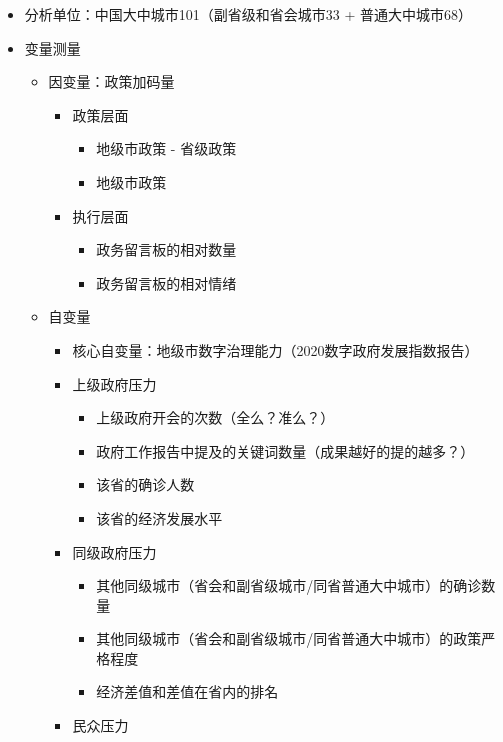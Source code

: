 \documentclass[
  12pt,
]{ctexart}
\providecommand{\tightlist}{%
  \setlength{\itemsep}{0pt}\setlength{\parskip}{0pt}}
\begin{document}
\begin{itemize}
\item
  分析单位：中国大中城市101（副省级和省会城市33 + 普通大中城市68）
\item
  变量测量

  \begin{itemize}
  \tightlist
  \item
    因变量：政策加码量

    \begin{itemize}
    \tightlist
    \item
      政策层面

      \begin{itemize}
      \tightlist
      \item
        地级市政策 - 省级政策
      \item
        地级市政策
      \end{itemize}
    \item
      执行层面

      \begin{itemize}
      \tightlist
      \item
        政务留言板的相对数量
      \item
        政务留言板的相对情绪
      \end{itemize}
    \end{itemize}
  \item
    自变量

    \begin{itemize}
    \tightlist
    \item
      核心自变量：地级市数字治理能力（2020数字政府发展指数报告）
    \item
      上级政府压力

      \begin{itemize}
      \tightlist
      \item
        上级政府开会的次数（全么？准么？）
      \item
        政府工作报告中提及的关键词数量（成果越好的提的越多？）
      \item
        该省的确诊人数
      \item
        该省的经济发展水平
      \end{itemize}
    \item
      同级政府压力

      \begin{itemize}
      \tightlist
      \item
        其他同级城市（省会和副省级城市/同省普通大中城市）的确诊数量
      \item
        其他同级城市（省会和副省级城市/同省普通大中城市）的政策严格程度
      \item
        经济差值和差值在省内的排名
      \end{itemize}
    \item
      民众压力


\end{itemize}
\end{itemize}
\end{itemize}
\end{document}
